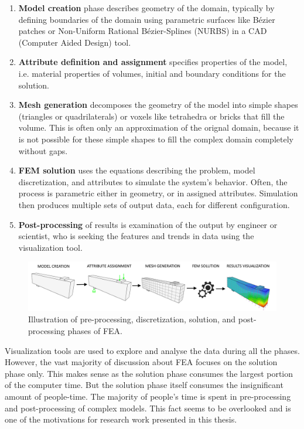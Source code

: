 \begin{enumerate}
    \item \textbf{Model creation} phase describes geometry of the domain, typically by defining boundaries of the domain using parametric surfaces like Bézier patches or Non-Uniform Rational B\'ezier-Splines (NURBS) \cite{Marsh2006} in a CAD (Computer Aided Design) tool.
    \item \textbf{Attribute definition and assignment} specifies properties of the model, i.e. material properties of volumes, initial and boundary conditions for the solution.
    \item \textbf{Mesh generation} decomposes the geometry of the model into simple shapes (triangles or quadrilaterals) or voxels like tetrahedra or bricks that fill the volume. This is often only an approximation of the orignal domain, because it is not possible for these simple shapes to fill the complex domain completely without gaps.
    \item \textbf{FEM solution} uses the equations describing the problem, model discretization, and attributes to simulate the system's behavior. Often, the process is parametric either in geometry, or in assigned attributes. Simulation then produces multiple sets of output data, each for different configuration.
    \item \textbf{Post-processing} of results is examination of the output by engineer or scientist, who is seeking the features and trends in data using the visualization tool.
\end{enumerate}

\begin{figure}[H]
    \centering
    \includegraphics[width=\textwidth]{figures/chapter-introduction/FEA-phases}
    \decoRule
    \caption[Illustration of all FEA phases.]{Illustration of pre-processing, discretization, solution, and post-processing phases of FEA.}
    \label{fig:FEA-phases}
\end{figure}

Visualization tools are used to explore and analyse the data during all the phases. However, the vast majority of discussion about FEA focuses on the solution phase only. This makes sense as the solution phase consumes the largest portion of the computer time. But the solution phase itself consumes the insignificant amount of people-time. The majority of people's time is spent in pre-processing and post-processing of complex models. This fact seems to be overlooked and is one of the motivations for research work presented in this thesis.

